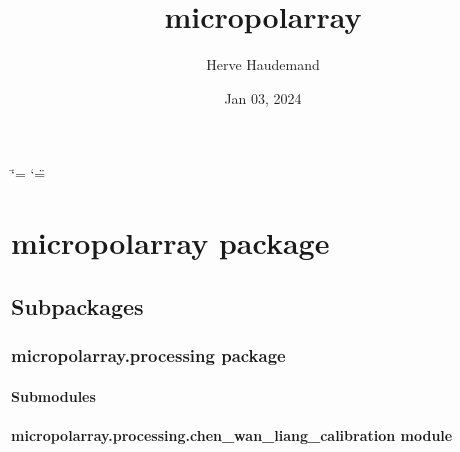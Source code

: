 \documentclass[letterpaper,10pt,english]{sphinxmanual}
\title{micropolarray}
\date{Jan 03, 2024}
\author{Herve Haudemand}
\begin{document}
\ifdefined\shorthandoff
  \ifnum\catcode`\=\string=\active\shorthandoff{=}\fi
  \ifnum\catcode`\"=\active{}\fi
\fi

\pagestyle{empty}
\sphinxmaketitle
\pagestyle{plain}
\sphinxtableofcontents
\pagestyle{normal}
\label{\detokenize{index::doc}}


\sphinxstepscope


\chapter{micropolarray package}
\label{\detokenize{micropolarray:micropolarray-package}}\label{\detokenize{micropolarray::doc}}

\section{Subpackages}
\label{\detokenize{micropolarray:subpackages}}
\sphinxstepscope


\subsection{micropolarray.processing package}
\label{\detokenize{micropolarray.processing:micropolarray-processing-package}}\label{\detokenize{micropolarray.processing::doc}}

\subsubsection{Submodules}
\label{\detokenize{micropolarray.processing:submodules}}

\subsubsection{micropolarray.processing.chen\_wan\_liang\_calibration module}
\label{\detokenize{micropolarray.processing:module-micropolarray.processing.chen_wan_liang_calibration}}\label{\detokenize{micropolarray.processing:micropolarray-processing-chen-wan-liang-calibration-module}}
\end{document}
